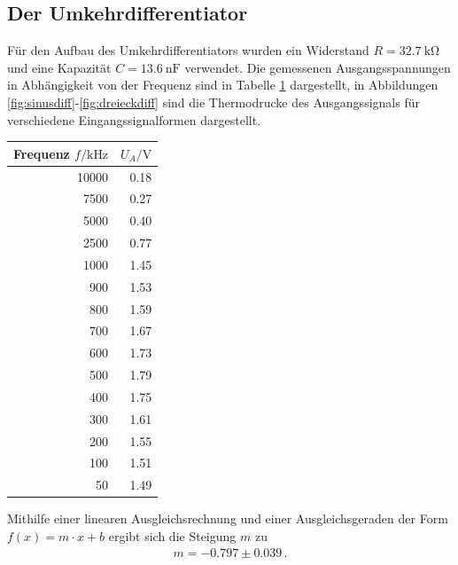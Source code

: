 \documentclass[]{scrartcl}
\begin{document}
\subsection{Der Umkehrdifferentiator}
Für den Aufbau des Umkehrdifferentiators wurden ein Widerstand $R=\SI{32.7}{\kilo\ohm}$ und eine Kapazität $C=\SI{13.6}{\nano\farad}$ verwendet. Die gemessenen Ausgangsspannungen in Abhängigkeit von der Frequenz sind in Tabelle \ref{tab:differentiator} dargestellt, in Abbildungen \ref{fig:sinusdiff}-\ref{fig:dreieckdiff} sind die Thermodrucke des Ausgangssignals für verschiedene Eingangssignalformen dargestellt.
\begin{table}[H]
	\label{tab:differentiator}
	\hskip-1.50cm
	\begin{tabular}{r r}
		\toprule
		Frequenz $f / \si{\kilo\hertz}$ & $U_A / \si{\volt}$ \\
		\midrule
		10000 & 0.18 \\
		7500  & 0.27 \\
		5000  & 0.40 \\
		2500  & 0.77 \\
		1000  & 1.45 \\
		900   & 1.53 \\
		800   & 1.59 \\
		700   & 1.67 \\
		600   & 1.73 \\
		500   & 1.79 \\
		400   & 1.75 \\
		300   & 1.61 \\
		200   & 1.55 \\
		100   & 1.51 \\
		50    & 1.49 \\
		\bottomrule
	\end{tabular}
\end{table}
Mithilfe einer linearen Ausgleichsrechnung und einer Ausgleichsgeraden der Form $f(x)=m\cdot x +b$ ergibt sich die Steigung $m$ zu
\begin{align*}
m = -0.797 \pm 0.039\,.
\end{align*}
\end{document}
